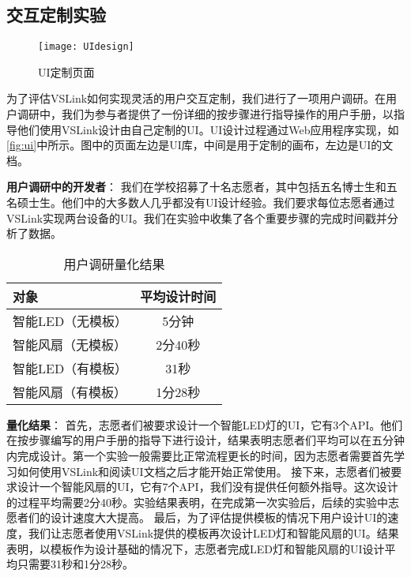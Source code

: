 \subsection{交互定制实验}

\begin{figure*}[htbp]
	\centering
	\texttt{[image: UIdesign]}
	\caption{UI定制页面}
	\label{fig:ui}
\end{figure*}

为了评估VSLink如何实现灵活的用户交互定制，我们进行了一项用户调研。在用户调研中，我们为参与者提供了一份详细的按步骤进行指导操作的用户手册，以指导他们使用VSLink设计由自己定制的UI。UI设计过程通过Web应用程序实现，如\autoref{fig:ui}中所示。图中的页面左边是UI库，中间是用于定制的画布，左边是UI的文档。

\textbf{用户调研中的开发者}： 
我们在学校招募了十名志愿者，其中包括五名博士生和五名硕士生。他们中的大多数人几乎都没有UI设计经验。我们要求每位志愿者通过VSLink实现两台设备的UI。我们在实验中收集了各个重要步骤的完成时间戳并分析了数据。


\begin{table}[htbp]
    \caption{用户调研量化结果}
	\label{table:feedback_quant}
	\begin{center}
		\begin{tabular}{|l|c|}
			\hline
			对象 & 平均设计时间 \\ \hline
			智能LED（无模板） & 5分钟 \\ \hline
			智能风扇（无模板） & 2分40秒 \\ \hline
			智能LED（有模板） & 31秒 \\ \hline
			智能风扇（有模板） & 1分28秒 \\ \hline
		\end{tabular}
	\end{center}
\end{table}
\textbf{量化结果}： 
首先，志愿者们被要求设计一个智能LED灯的UI，它有3个API。他们在按步骤编写的用户手册的指导下进行设计，结果表明志愿者们平均可以在五分钟内完成设计。第一个实验一般需要比正常流程更长的时间，因为志愿者需要首先学习如何使用VSLink和阅读UI文档之后才能开始正常使用。
接下来，志愿者们被要求设计一个智能风扇的UI，它有7个API，我们没有提供任何额外指导。这次设计的过程平均需要2分40秒。实验结果表明，在完成第一次实验后，后续的实验中志愿者们的设计速度大大提高。
最后，为了评估提供模板的情况下用户设计UI的速度，我们让志愿者使用VSLink提供的模板再次设计LED灯和智能风扇的UI。结果表明，以模板作为设计基础的情况下，志愿者完成LED灯和智能风扇的UI设计平均只需要31秒和1分28秒。

